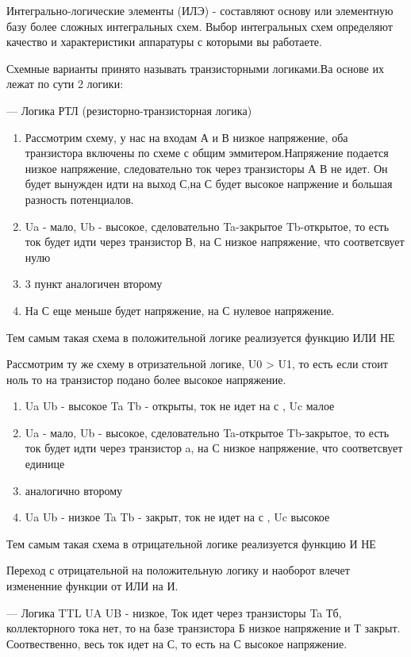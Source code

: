 \documentclass[../main.tex]{subfiles}
\begin{document}
Интегрально-логические элементы (ИЛЭ) - составляют основу или элементную базу более сложных интегральных схем. Выбор интегральных схем
определяют качество и характеристики аппаратуры с которыми вы работаете.

Схемные варианты принято называть транзисторными логиками.Ва основе их лежат по сути 2 логики:

--- Логика РТЛ (резисторно-транзисторная логика)
\begin{enumerate}
    \item Рассмотрим схему, у нас на входам А и В низкое напряжение, оба транзистора включены по схеме с общим эммитером.Напряжение подается низкое напряжение, следовательно ток через транзисторы 
А В не идет. Он будет вынужден идти на выход С,на С будет высокое напржение и большая разность потенциалов.
    \item Ua - мало, Ub - высокое, сделовательно Ta-закрытое Tb-открытое, то есть ток будет идти через транзистор В, на С низкое напряжение, что соответсвует нулю
    \item 3 пункт аналогичен второму
    \item На С еще меньше будет напряжение, на С нулевое напряжение.
\end{enumerate}
Тем самым такая схема в положительной логике реализуется функцию ИЛИ НЕ

Рассмотрим ту же схему в отризательной логике, U0 > U1, то есть если стоит ноль то на транзистор подано более высокое напряжение.
\begin{enumerate}
    \item Ua Ub - высокое Ta Tb - открыты, ток не идет на с , Uc малое
    \item Ua - мало, Ub - высокое, сделовательно Ta-открытое Tb-закрытое, то есть ток будет идти через транзистор a, на С низкое напряжение, что соответсвует единице
    \item аналогично второму
    \item Ua Ub - низкое Ta Tb - закрыт, ток не идет на с , Uc высокое
\end{enumerate}
Тем самым такая схема в отрицательной логике реализуется функцию И НЕ

Переход с отрицательной на положительную логику и наоборот влечет измененние функции от ИЛИ на И.

--- Логика TTL
UA UB - низкое, Ток идет через транзисторы Ta Тб, коллекторного тока нет, то на базе транзистора Б низкое напряжение и Т закрыт. Соотвественно, весь ток идет на С,
то есть на С высокое напряжение.
\end{document}
